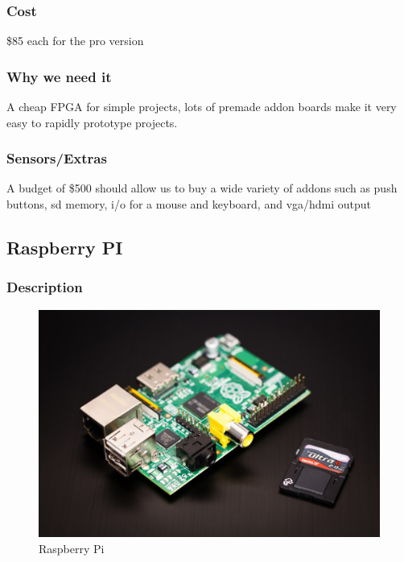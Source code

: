 \documentclass[12pt]{article}
\begin{document}
\subsubsection{Cost}

\$85 each for the pro version

\subsubsection{Why we need it}

A cheap FPGA for simple projects, lots of premade addon boards make it very easy to rapidly prototype projects.

\subsubsection{Sensors/Extras}

A budget of \$500 should allow us to buy a wide variety of addons
such as push buttons, sd memory, i/o for a mouse and keyboard, and vga/hdmi
output

\subsection{Raspberry PI}

\subsubsection{Description}

\begin{figure}
  \centering
  \includegraphics[scale=.5]{images/pi}
  \caption{Raspberry Pi}
  \label{fig:pi}
\end{figure}
\end{document}
